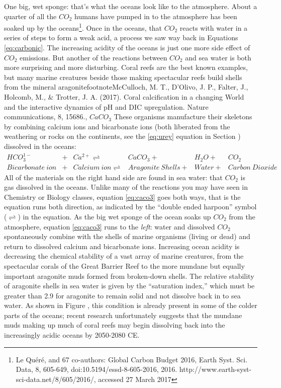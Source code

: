 \documentclass[amstex,12pt]{book}
\begin{document}
One big, wet sponge: that's what the oceans look like to the atmosphere. About a quarter of all the $CO_2$ humans have pumped in to the atmosphere has been soaked up by the oceans\footnote{ Le Quéré, and 67 co-authors: Global Carbon Budget 2016, Earth Syst. Sci. Data, 8, 605-649, doi:10.5194/essd-8-605-2016, 2016. http://www.earth-syst-sci-data.net/8/605/2016/, accessed 27 March 2017}. Once in the oceans, that $CO_2$ reacts with water in a series of steps to form a weak acid, a process we saw way back in Equations \ref{eq:carbonic}. The increasing acidity of the oceans is just one more side effect of $CO_2$ emissions. But another of the reactions between $CO_2$ and sea water is both more surprising and more disturbing. Coral reefs are the best known examples, but many marine creatures beside those making spectacular reefs build shells from the mineral aragonite{footnote{McCulloch, M. T., D’Olivo, J. P., Falter, J., Holcomb, M., \& Trotter, J. A. (2017). Coral calcification in a changing World and the interactive dynamics of pH and DIC upregulation. Nature communications, 8, 15686.}, $CaCO_3$ These organisms manufacture their skeletons by combining calcium ions and bicarbonate ions (both liberated from the weathering or rocks on the continents, see the \ref{eq:urey} equation in Section \label{swrwl}) dissolved in the oceans: 
\begin{align} \label{eq:caco3}
	HCO_3^{1-} & + & Ca^{2+} \rightleftharpoons & CaCO_3 + & H_2O + & CO_2\\
	Bicarbonate \ ion & + & Calcium \ ion \rightleftharpoons & Aragonite \ Shells + & Water+ & Carbon \ Dioxide 
\end{align}
All of the materials on the right hand side are found in sea water: that $CO_2$ is gas dissolved in the oceans. Unlike many of the reactions you may have seen in Chemistry or Biology classes, equation \ref{eq:caco3} goes both ways, that is the equation runs both direction, as indicated by the ``double ended harpoon'' symbol ($\rightleftharpoons$) in the equation. As the big wet sponge of the ocean soaks up $CO_2$ from the atmosphere, equation \ref{eq:caco3} runs to the \emph{left}: water and dissolved $CO_2$ spontaneously combine with the shells of marine organisms (living or dead) and return to dissolved calcium and bicarbonate ions. Increasing ocean acidity is decreasing the chemical stability of a vast array of marine creatures, from the spectacular corals of the Great Barrier Reef to the more mundane but equally important aragonite muds formed from broken-down shells. The relative stability of aragonite shells in sea water is given by the ``saturation index,'' which must be greater than 2.9 for aragonite to remain solid and not dissolve back in to sea water. As shown in Figure \label{fig:arag_map}, this condition is already present in some of the colder parts of the oceans; recent research unfortunately suggests that the mundane muds making up much of coral reefs may begin dissolving back into the increasingly acidic oceans by 2050-2080 CE. \\
}
\end{document}
